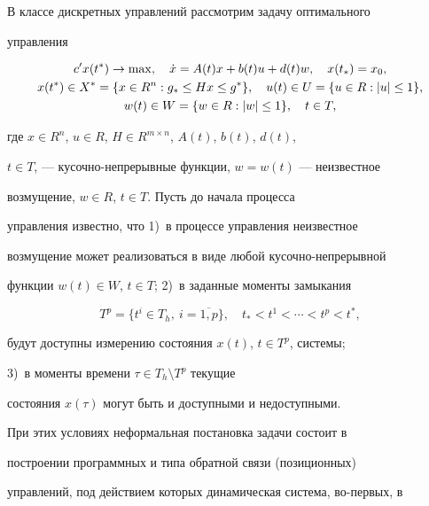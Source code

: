 В классе дискретных управлений рассмотрим задачу оптимального


управления


\begin{gather}


c'x(t^{*})\rightarrow \max,\quad \Dot x=A(t)x+b(t)u+d(t)w,\quad


x(t_*)=x_{0},\\


%


x(t^*) \in X^*=\{x \in R^n:g_*\le Hx \le g^*\},\quad u(t) \in U=\{u \in


R:|u| \le 1\}, \notag \\


%


w(t) \in W=\{w \in R:|w| \le 1\},\quad t \in T,\notag


\end{gather}


где $x \in R^n$, $u\in R$, $H \in R^{m \times n}$, $A(t)$, $b(t)$, $d(t)$,


$t \in T$, --- кусочно-непрерывные функции, $w=w(t)$ --- неизвестное


возмущение, $w \in R$, $t \in T$. Пусть до начала процесса


управления известно, что 1)~в процессе управления неизвестное


возмущение  может реализоваться в виде любой кусочно-непрерывной


функции $w(t) \in W$, $t \in T$; 2)~в заданные моменты замыкания


\begin{equation}


T^p=\{t^i\in T_h,\ i=\overline{1,p}\},\quad t_* < t^1<\dotsb<t^p<t^*,


\end{equation}


будут доступны измерению состояния $x(t)$, $t \in T^p$, системы;


3)~в моменты времени  $\tau \in T_{h} \setminus T^p$ текущие


состояния $x(\tau)$ могут быть и доступными и недоступными.





При этих условиях неформальная постановка задачи состоит в


построении программных и типа обратной связи (позиционных)


управлений, под действием которых динамическая система, во-первых, в


